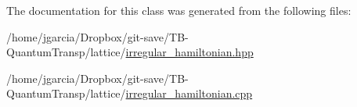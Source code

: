 The documentation for this class was generated from the following files\+:\begin{DoxyCompactItemize}
\item 
/home/jgarcia/\+Dropbox/git-\/save/\+T\+B-\/\+Quantum\+Transp/lattice/\hyperlink{irregular__hamiltonian_8hpp}{irregular\+\_\+hamiltonian.\+hpp}\item 
/home/jgarcia/\+Dropbox/git-\/save/\+T\+B-\/\+Quantum\+Transp/lattice/\hyperlink{irregular__hamiltonian_8cpp}{irregular\+\_\+hamiltonian.\+cpp}\end{DoxyCompactItemize}
